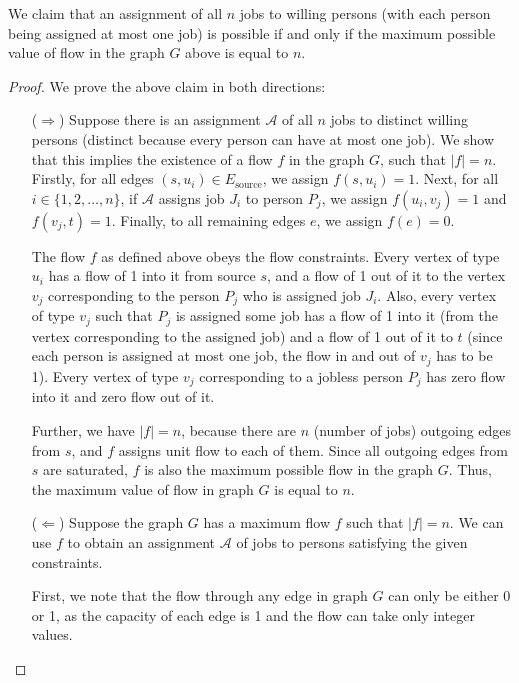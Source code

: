 \documentclass[11pt, fleqn]{article}
\begin{document}
\bigskip

We claim that an assignment of all $n$ jobs to willing persons (with each person being assigned at most one job) is possible if and only if the maximum possible value of flow in the graph $G$ above is equal to $n$.

\begin{proof}
We prove the above claim in both directions:
\begin{itemize}
    \item[($\Rightarrow$)]
    Suppose there is an assignment $\mathcal{A}$ of all $n$ jobs to distinct willing persons (distinct because every person can have at most one job). We show that this implies the existence of a flow $f$ in the graph $G$, such that $|f| = n$. Firstly, for all edges $(s,u_i)\in E_{\text{source}}$, we assign $f(s,u_i)=1$. Next, for all $i\in\{1,2,\dots,n\}$, if $\mathcal{A}$ assigns job $J_i$ to person $P_j$, we assign $f(u_i,v_j)=1$ and $f(v_j,t)=1$. Finally, to all remaining edges $e$, we assign $f(e)=0$.
    
    The flow $f$ as defined above obeys the flow constraints. Every vertex of type $u_i$ has a flow of 1 into it from source $s$, and a flow of 1 out of it to the vertex $v_j$ corresponding to the person $P_j$ who is assigned job $J_i$. Also, every vertex of type $v_j$ such that $P_j$ is assigned some job has a flow of 1 into it (from the vertex corresponding to the assigned job) and a flow of 1 out of it to $t$ (since each person is assigned at most one job, the flow in and out of $v_j$ has to be 1). Every vertex of type $v_j$ corresponding to a jobless person $P_j$ has zero flow into it and zero flow out of it.
    
    Further, we have $|f|=n$, because there are $n$ (number of jobs) outgoing edges from $s$, and $f$ assigns unit flow to each of them. Since all outgoing edges from $s$ are saturated, $f$ is also the maximum possible flow in the graph $G$. Thus, the maximum value of flow in graph $G$ is equal to $n$.
    
    \item[($\Leftarrow$)]
    Suppose the graph $G$ has a maximum flow $f$ such that $|f|=n$. We can use $f$ to obtain an assignment $\mathcal{A}$ of jobs to persons satisfying the given constraints.
    
    First, we note that the flow through any edge in graph $G$ can only be either 0 or 1, as the capacity of each edge is 1 and the flow can take only integer values.
    

\end{itemize}
\end{proof}
\end{document}
